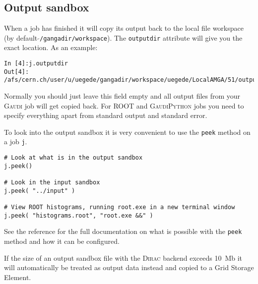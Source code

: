 \documentclass{howto}
\def\root {\textsc{ROOT}\xspace}
\def\gaudi {\textsc{Gaudi}\xspace}
\def\gaudipython {\textsc{GaudiPython}\xspace}
\def\dirac {\textsc{Dirac}\xspace}
\begin{document}
\subsection{Output sandbox}
\label{sec:OutputSandbox}
When a job has finished it will copy its output back to the local file
workspace (by default \texttt{$\tilde{}$/gangadir/workspace}). The
\texttt{outputdir} attribute will give you the exact location. As an example:
\begin{verbatim}
In [4]:j.outputdir
Out[4]: /afs/cern.ch/user/u/uegede/gangadir/workspace/uegede/LocalAMGA/51/output
\end{verbatim}

Normally you should just leave this field empty and all output files from your
\gaudi job will get copied back. For \root and \gaudipython jobs you need to
specify everything apart from standard output and standard error.

To look into the output sandbox it is very convenient to use the \texttt{peek}
method on a job \texttt{j}.
\begin{verbatim}
# Look at what is in the output sandbox
j.peek()

# Look in the input sandbox
j.peek( "../input" )

# View ROOT histograms, running root.exe in a new terminal window
j.peek( "histograms.root", "root.exe &&" )
\end{verbatim}

See the reference for the full documentation on what is possible with the
\texttt{peek} method and how it can be configured.

If the size of an output sandbox file with the \dirac backend exceeds 10~Mb it
will automatically be treated as output data instead and copied to a Grid
Storage Element.
\end{document}
